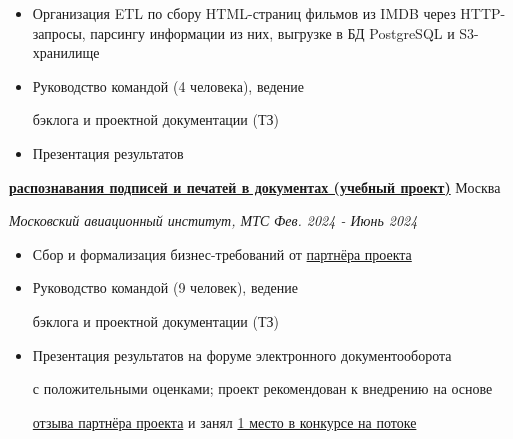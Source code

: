 \documentclass[14pt, a4paper, oneside]{extarticle}
\begin{document}
\begin{itemize}
	\vspace{-2\intextsep}
	\item Организация ETL по сбору HTML-страниц фильмов из IMDB через HTTP-запросы,
    парсингу информации из них, выгрузке в БД PostgreSQL и S3-хранилище
	\vspace{-2\intextsep}
    \item Руководство командой (4 человека), ведение 

    \vspace{-0.5\intextsep}
    бэклога и проектной документации (ТЗ)
    \vspace{-0.8\intextsep}
    \item Презентация результатов
\end{itemize}


\begin{flushleft}
	\vspace{-0.8\intextsep}
	\quad
	\href{https://github.com/Crazy5202/CM_2024}{\textbf{ распознавания подписей и печатей в документах (учебный проект)}}
	\hfill
	Москва
\end{flushleft}

\begin{flushleft}
	\vspace{-1\intextsep}
	\quad
	\textit{Московский авиационный институт, МТС}
	\hfill
	\textit{\small Фев. 2024 - Июнь 2024}
\end{flushleft}


\begin{itemize}
	\vspace{-2\intextsep}
    \item Сбор и формализация бизнес-требований от \href{https://vk.ru/kearkhipov}{партнёра проекта}
	\vspace{-0.8\intextsep}
    \item Руководство командой (9 человек), ведение 
    
    \vspace{-0.5\intextsep}
    бэклога и проектной документации (ТЗ)
    \vspace{-0.8\intextsep}
    \item Презентация результатов на форуме электронного документооборота
    
    \vspace{-0.5\intextsep}
    с положительными оценками; проект рекомендован к внедрению на основе
    
    \vspace{-0.5\intextsep}
 	\href{https://github.com/Crazy5202/job_application_form/tree/main/portfolio/EDMS/%D0%9E%D1%82%D0%B7%D1%8B%D0%B2_%D0%B2%D0%BD%D0%B5%D0%B4%D1%80%D0%B5%D0%BD%D0%B8%D0%B5.pdf}{отзыва партнёра проекта} и занял \href{https://github.com/Crazy5202/job_application_form/tree/main/portfolio/EDMS/%D0%9F%D0%BE%D0%B1%D0%B5%D0%B4%D0%B8%D1%82%D0%B5%D0%BB%D1%8C_%D0%A6%D0%9A.pdf}{1 место в конкурсе на потоке}
\end{itemize}
\end{document}
